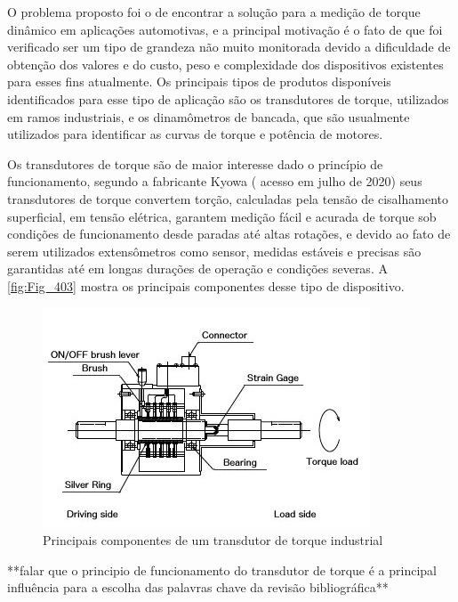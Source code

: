 O problema proposto foi o de encontrar a solução para a medição de torque dinâmico em aplicações automotivas, e a principal motivação é o fato de que foi verificado ser um tipo de grandeza não muito monitorada devido a dificuldade de obtenção dos valores e do custo, peso e complexidade dos dispositivos existentes para esses fins atualmente. Os principais tipos de produtos disponíveis identificados para esse tipo de aplicação são os transdutores de torque, utilizados em ramos industriais, e os dinamômetros de bancada, que são usualmente utilizados para identificar as curvas de torque e potência de motores.

Os transdutores de torque são de maior interesse dado o princípio de funcionamento, segundo a fabricante Kyowa  (%
acesso em julho de 2020) seus transdutores de torque convertem torção, calculadas pela tensão de cisalhamento superficial, em tensão elétrica, garantem medição fácil e acurada de torque sob condições de funcionamento desde paradas até altas rotações, e devido ao fato de serem utilizados extensômetros como sensor, medidas estáveis e precisas são garantidas até em longas durações de operação e condições severas. A \autoref{fig:Fig_403} mostra os principais componentes desse tipo de dispositivo.

\begin{figure}[htb]
	\caption{\label{fig:Fig_403}Principais componentes de um transdutor de torque industrial}
	\begin{center}
		\includegraphics{images/img403.jpg}
	\end{center}
\end{figure}

**falar que o principio de funcionamento do transdutor de torque é a principal influência para a escolha das palavras chave da revisão bibliográfica**

